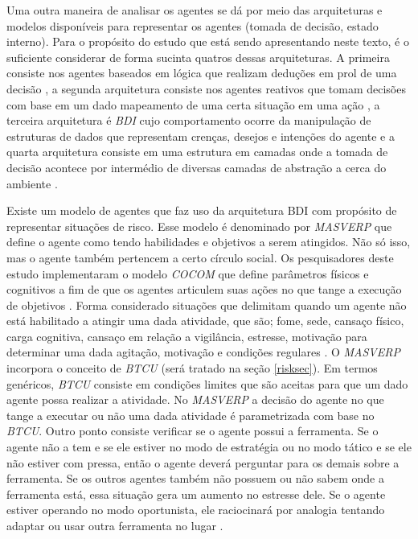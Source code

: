 Uma outra maneira de analisar os agentes se dá por meio das arquiteturas e modelos disponíveis para representar os agentes (tomada de decisão, estado interno). Para o propósito do estudo que está sendo apresentando neste texto, é o suficiente considerar de forma sucinta quatros dessas arquiteturas. A primeira consiste nos agentes baseados em lógica que realizam deduções em prol de uma decisão \cite{logicagent}, a segunda arquitetura consiste nos agentes reativos que tomam decisões com base em um dado mapeamento de uma certa situação em uma  ação \cite{reactiveagent}, a terceira arquitetura é \textit{BDI} cujo comportamento ocorre da manipulação de estruturas de dados que representam crenças, desejos e intenções do agente \cite{bdi} e a quarta arquitetura consiste em uma estrutura 
em camadas onde a tomada de decisão acontece por intermédio de diversas camadas de abstração a cerca do ambiente \cite{layeragent} \cite{whatisagent}.  

Existe um modelo de agentes que faz uso da arquitetura BDI com propósito de representar situações de risco. Esse modelo é denominado por    \textit{MASVERP} que define o agente como tendo habilidades e objetivos a serem atingidos. Não só isso, mas o agente também pertencem a certo círculo social. Os pesquisadores deste estudo implementaram o modelo \textit{COCOM} que define parâmetros físicos e cognitivos a fim de que os agentes articulem suas ações no que tange a execução de objetivos \cite{mavesp}. Forma considerado situações que delimitam quando um agente não está habilitado a atingir uma dada atividade, que são; fome, sede, cansaço físico, carga cognitiva, cansaço em relação a vigilância, estresse, motivação para determinar uma dada agitação, motivação e condições regulares \cite{mavesp}. O \textit{MASVERP} incorpora o conceito de \textit{BTCU} (será tratado na seção \ref{risksec}). Em termos genéricos, \textit{BTCU} 
consiste em condições limites que são aceitas para que um dado agente possa realizar a atividade. No \textit{MASVERP} a decisão do agente no que tange a executar ou não uma dada atividade é parametrizada com base no \textit{BTCU}. Outro ponto consiste verificar se o agente possui a ferramenta. Se o agente não a tem e se ele estiver no modo de estratégia ou no modo tático e se ele não estiver com pressa, então o agente deverá perguntar para os demais sobre a ferramenta. Se os outros agentes também não possuem ou não sabem onde a ferramenta está, essa situação gera um aumento no estresse dele. Se o agente estiver operando no modo oportunista, ele raciocinará por analogia tentando adaptar ou usar outra ferramenta no lugar \cite{mavesp}. 